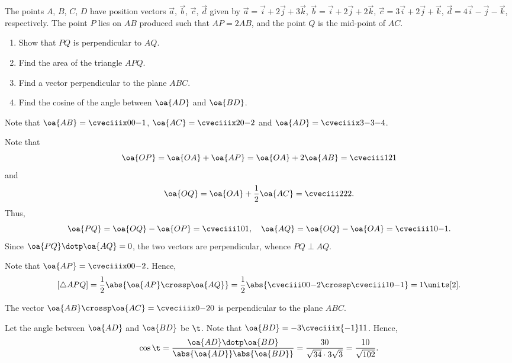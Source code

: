 \begin{problem}
    The points $A$, $B$, $C$, $D$ have position vectors $\vec a$, $\vec b$, $\vec c$, $\vec d$ given by $\vec a = \vec i + 2\vec j + 3\vec k$, $\vec b = \vec i + 2\vec j + 2\vec k$, $\vec c = 3\vec i + 2 \vec j + \vec k$, $\vec d = 4\vec i - \vec j - \vec k$, respectively. The point $P$ lies on $AB$ produced such that $AP = 2AB$, and the point $Q$ is the mid-point of $AC$.

    \begin{enumerate}
        \item Show that $PQ$ is perpendicular to $AQ$.
        \item Find the area of the triangle $APQ$.
        \item Find a vector perpendicular to the plane $ABC$.
        \item Find the cosine of the angle between $\oa{AD}$ and $\oa{BD}$.
    \end{enumerate}
\end{problem}
\begin{solution}
    Note that $\oa{AB} = \cveciiix00{-1}$, $\oa{AC} = \cveciiix20{-2}$ and $\oa{AD} = \cveciiix3{-3}{-4}$.
    \begin{ppart}
        Note that \[\oa{OP} = \oa{OA} + \oa{AP} = \oa{OA} + 2\oa{AB} = \cveciii121\] and \[\oa{OQ} = \oa{OA} + \frac12 \oa{AC} = \cveciii222.\] Thus, \[\oa{PQ} = \oa{OQ} - \oa{OP} = \cveciii101, \quad \oa{AQ} = \oa{OQ} - \oa{OA} = \cveciii10{-1}.\] Since $\oa{PQ} \dotp \oa{AQ} = 0$, the two vectors are perpendicular, whence $PQ \perp AQ$.
    \end{ppart}
    \begin{ppart}
        Note that $\oa{AP} = \cveciiix00{-2}$. Hence, \[[\triangle APQ] = \frac12 \abs{\oa{AP} \crossp \oa{AQ}} = \frac12 \abs{\cveciii00{-2} \crossp \cveciii10{-1}} = 1 \units[2].\]
    \end{ppart}
    \begin{ppart}
        The vector $\oa{AB} \crossp \oa{AC} = \cveciiix0{-2}0$ is perpendicular to the plane $ABC$.
    \end{ppart}
    \begin{ppart}
        Let the angle between $\oa{AD}$ and $\oa{BD}$ be $\t$. Note that $\oa{BD} = -3\cveciiix{-1}11$. Hence, \[\cos\t = \frac{\oa{AD} \dotp \oa{BD}}{\abs{\oa{AD}} \abs{\oa{BD}}} = \frac{30}{\sqrt{34}\cdot3\sqrt{3}} = \frac{10}{\sqrt{102}}.\]
    \end{ppart}
\end{solution}